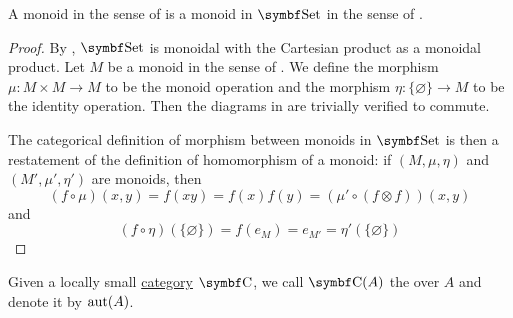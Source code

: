 \begin{proposition}\label{thm:monoids_are_monoids_in_set}
  A monoid in the sense of  is a monoid in \( \Cat{Set} \) in the sense of .
\end{proposition}
\begin{proof}
  By , \( \Cat{Set} \) is monoidal with the Cartesian product as a monoidal product. Let \( M \) be a monoid in the sense of . We define the morphism \( \mu: M \times M \to M \) to be the monoid operation and the morphism \( \eta: \{ \varnothing \} \to M \) to be the identity operation. Then the diagrams in  are trivially verified to commute.

  The categorical definition of morphism between monoids in \( \Cat{Set} \) is then a restatement of the definition of homomorphism of a monoid: if \( (M, \mu, \eta) \) and \( (M', \mu', \eta') \) are monoids, then
  \begin{equation*}
    (f \circ \mu)(x, y)
    =
    f(xy)
    =
    f(x) f(y)
    =
    (\mu' \circ (f \otimes f))(x, y)
  \end{equation*}
  and
  \begin{equation*}
    (f \circ \eta)(\{ \varnothing \})
    =
    f(e_M)
    =
    e_{M'}
    =
    \eta'(\{ \varnothing \})
  \end{equation*}
\end{proof}

\begin{definition}\label{def:automorphism_group}
  Given a locally small \hyperref[def:category]{category} \( \Cat{C} \), we call \( \Cat{C}(A) \) the  over \( A \) and denote it by \( \operatorname{aut}(A) \).
\end{definition}

